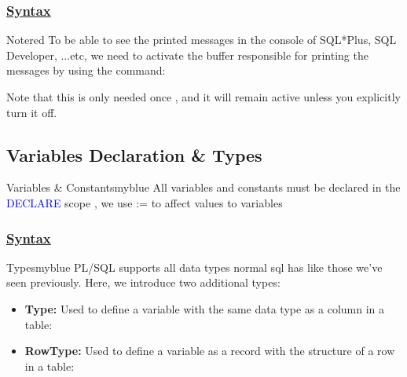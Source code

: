 \subsubsection*{\underline{Syntax}}




\vspace{0.25cm}

\begin{prettyBox}{Note}{red}
To be able to see the printed messages in the console of SQL*Plus, SQL Developer, ...etc, we need to activate
the buffer responsible for printing the messages by using the command: 



Note that this is only needed once , and it will remain active unless you explicitly turn it off.
\end{prettyBox}

\vspace{0.5cm}

\subsection{Variables Declaration \& Types}

\begin{prettyBox}{Variables \& Constants}{myblue}
All variables and constants must be declared in the \textcolor{blue}{DECLARE} scope , 
we use := to affect values to variables 
\end{prettyBox}

\subsubsection*{\underline{Syntax}}



\vspace{0.25cm}
\begin{prettyBox}{Types}{myblue}
PL/SQL supports all data types normal sql has like those we've seen previously. Here, we introduce two additional types:

\begin{itemize}
    \item \textbf{Type:} Used to define a variable with the same data type as a column in a table:
    


    \item \textbf{RowType:} Used to define a variable as a record with the structure of a row in a table:

\end{itemize}

\end{prettyBox}



